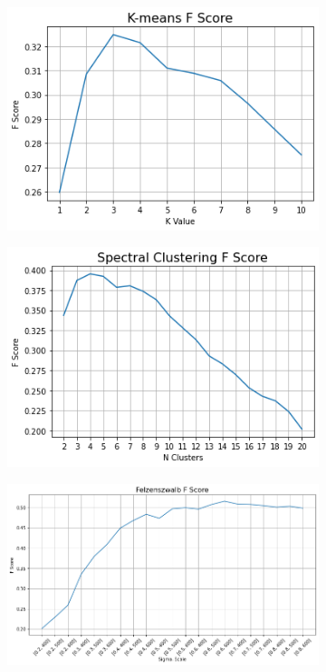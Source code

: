 \documentclass[12pt]{extarticle}
\begin{document}
    \begin{figure}[!h] %
      \begin{subfigure}[b]{0.5\textwidth}
        \includegraphics[width=\textwidth]{kmeans_score.png}
        \caption{}
        \label{fig:f1}
      \end{subfigure}
      \hfill
      \begin{subfigure}[b]{0.5\textwidth}
        \includegraphics[width=\textwidth]{spectral_score.png}
        \caption{}
        \label{fig:f2}
      \end{subfigure}
      \hfill
      \begin{subfigure}[b]{\textwidth}
        \includegraphics[width=\textwidth]{felzenszwalb_score.png}

\end{subfigure}
\end{figure}
\end{document}
